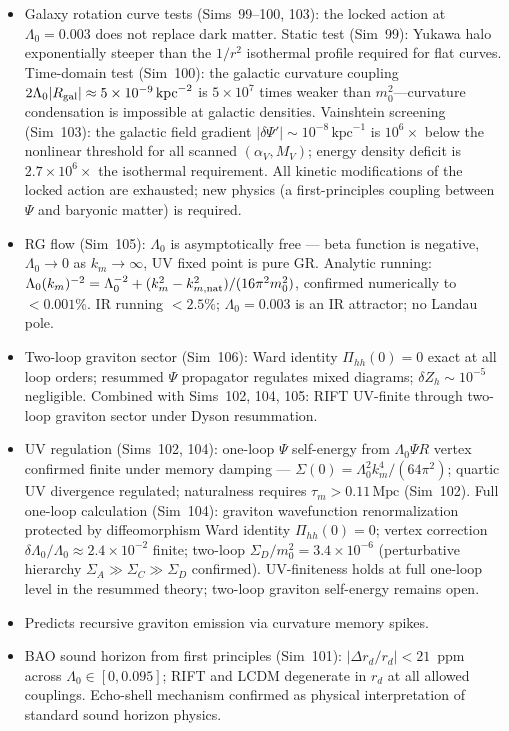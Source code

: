 \documentclass[12pt,a4paper]{article}
\begin{document}
\begin{itemize}
  \item Galaxy rotation curve tests (Sims~99--100, 103): the locked action at $\Lambda_0=0.003$ does not replace dark matter.  Static test (Sim~99): Yukawa halo exponentially steeper than the $1/r^2$ isothermal profile required for flat curves.  Time-domain test (Sim~100): the galactic curvature coupling $2\Lambda_0|R_{\rm gal}|\approx5\times10^{-9}\,{\rm kpc}^{-2}$ is $5\times10^7$ times weaker than $m_0^2$---curvature condensation is impossible at galactic densities.  Vainshtein screening (Sim~103): the galactic field gradient $|\delta\Psi'|\sim10^{-8}\,\mathrm{kpc}^{-1}$ is $10^6\times$ below the nonlinear threshold for all scanned $(\alpha_V,M_V)$; energy density deficit is $2.7\times10^6\times$ the isothermal requirement.  All kinetic modifications of the locked action are exhausted; new physics (a first-principles coupling between $\Psi$ and baryonic matter) is required.
  \item RG flow (Sim~105): $\Lambda_0$ is asymptotically free --- beta function is negative, $\Lambda_0\to 0$ as $k_m\to\infty$, UV fixed point is pure GR.  Analytic running: $\Lambda_0(k_m)^{-2} = \Lambda_0^{-2}+(k_m^2-k_{m,\rm nat}^2)/(16\pi^2 m_0^2)$, confirmed numerically to $<0.001\%$.  IR running $<2.5\%$; $\Lambda_0=0.003$ is an IR attractor; no Landau pole.
  \item Two-loop graviton sector (Sim~106): Ward identity $\Pi_{hh}(0)=0$ exact at all loop orders; resummed $\Psi$ propagator regulates mixed diagrams; $\delta Z_h\sim10^{-5}$ negligible. Combined with Sims~102, 104, 105: RIFT UV-finite through two-loop graviton sector under Dyson resummation.
  \item UV regulation (Sims~102, 104): one-loop $\Psi$ self-energy from $\Lambda_0\Psi R$ vertex confirmed finite under memory damping --- $\Sigma(0) = \Lambda_0^2 k_m^4/(64\pi^2)$; quartic UV divergence regulated; naturalness requires $\tau_m > 0.11\,\mathrm{Mpc}$ (Sim~102).  Full one-loop calculation (Sim~104): graviton wavefunction renormalization protected by diffeomorphism Ward identity $\Pi_{hh}(0)=0$; vertex correction $\delta\Lambda_0/\Lambda_0 \approx 2.4\times10^{-2}$ finite; two-loop $\Sigma_D/m_0^2 = 3.4\times10^{-6}$ (perturbative hierarchy $\Sigma_A \gg \Sigma_C \gg \Sigma_D$ confirmed).  UV-finiteness holds at full one-loop level in the resummed theory; two-loop graviton self-energy remains open.
  \item Predicts recursive graviton emission via curvature memory spikes.
  \item BAO sound horizon from first principles (Sim~101): $|\Delta r_d/r_d| < 21$~ppm across $\Lambda_0 \in [0, 0.095]$; RIFT and LCDM degenerate in $r_d$ at all allowed couplings. Echo-shell mechanism confirmed as physical interpretation of standard sound horizon physics.
\end{itemize}
\end{document}
